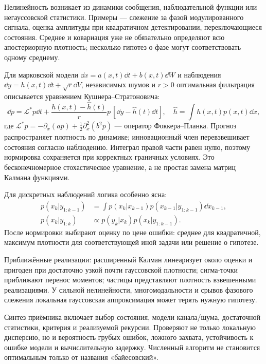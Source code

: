 
Нелинейность возникает из динамики сообщения, наблюдательной функции или негауссовской статистики. Примеры — слежение за фазой модулированного сигнала, оценка амплитуды при квадратичном детектировании, переключающиеся состояния. Среднее и ковариация уже не обязательно определяют всю апостериорную плотность; несколько гипотез о фазе могут соответствовать одному среднему.

Для марковской модели $\dd x=a(x,t)\dd t+b(x,t)\dd W$ и наблюдения $\dd y=h(x,t)\dd t+\sqrt r\dd V$, независимых шумов и $r>0$ оптимальная фильтрация описывается уравнением Кушнера–Стратоновича:
\begin{equation}
 \dd p=\mathcal L^*p\dd t+
 \frac{h(x,t)-\hat h(t)}r p\,[\dd y-\hat h(t)\dd t],\quad
 \hat h=\int h(x,t)p(x,t)\dd x,
\end{equation}
где $\mathcal L^*p=-\partial_x(ap)+\frac12\partial_x^2(b^2p)$ — оператор Фоккера–Планка. Прогноз распространяет плотность по динамике; инновационный член перевзвешивает состояния согласно наблюдению. Интеграл правой части равен нулю, поэтому нормировка сохраняется при корректных граничных условиях. Это бесконечномерное стохастическое уравнение, а не простая замена матриц Калмана функциями.

Для дискретных наблюдений логика особенно ясна:
\begin{align}
 p(x_k|y_{1:k-1})&=\int p(x_k|x_{k-1})p(x_{k-1}|y_{1:k-1})\dd x_{k-1},\\
 p(x_k|y_{1:k})&\propto p(y_k|x_k)p(x_k|y_{1:k-1}).
\end{align}
После нормировки выбирают оценку по цене ошибки: среднее для квадратичной, максимум плотности для соответствующей иной задачи или решение о гипотезе.

Приближённые реализации: расширенный Калман линеаризует около оценки и пригоден при достаточно узкой почти гауссовской плотности; сигма-точки приближают перенос моментов; частицы представляют плотность взвешенными реализациями. У сильной нелинейности, многомодальности и срывов фазового слежения локальная гауссовская аппроксимация может терять нужную гипотезу.

Синтез приёмника включает выбор состояния, модели канала/шума, достаточной статистики, критерия и реализуемой рекурсии. Проверяют не только локальную дисперсию, но и вероятность грубых ошибок, ложного захвата, устойчивость к ошибке модели и вычислительную задержку. Численный алгоритм не становится оптимальным только от названия «байесовский».
